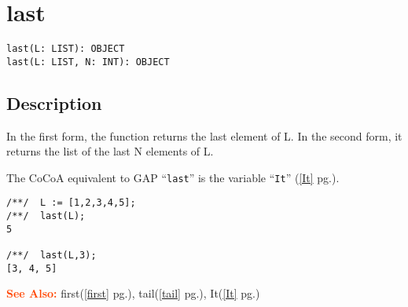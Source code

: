 \documentclass[a4paper]{mybook}
\newenvironment{command}{}{} %
\newcommand\SeeAlso{\par\textcolor{OrangeRed}{\textbf{\large See Also: }}}
\begin{document}
\section{last}
\label{last}
\begin{command} %


\begin{Verbatim}[label=syntax, rulecolor=\color{MidnightBlue},
frame=single]
last(L: LIST): OBJECT
last(L: LIST, N: INT): OBJECT
\end{Verbatim}


\subsection*{Description}

In the first form, the function returns the last element of L.  In
the second form, it returns the list of the last N elements of L.
\par 
The CoCoA equivalent to GAP ``\verb&last&'' is the variable ``\verb&It&'' (\ref{It} pg.\pageref{It}).
\begin{Verbatim}[label=example, rulecolor=\color{PineGreen}, frame=single]
/**/  L := [1,2,3,4,5];
/**/  last(L);
5

/**/  last(L,3);
[3, 4, 5]
\end{Verbatim}


\SeeAlso %
  first(\ref{first} pg.\pageref{first}), 
    tail(\ref{tail} pg.\pageref{tail}), 
    It(\ref{It} pg.\pageref{It})
\end{command} %
\end{document}
